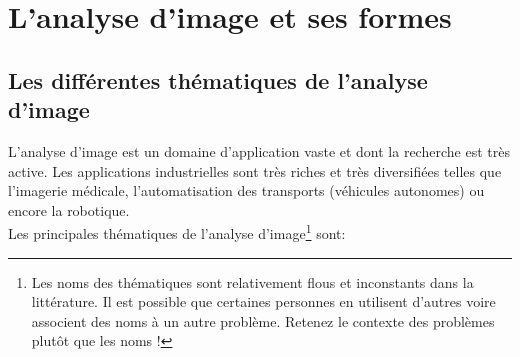 \section{L'analyse d'image et ses formes}
\label{conv_sec}
\subsection{Les différentes thématiques de l'analyse d'image}
L'analyse d'image est un domaine d'application vaste et dont la recherche est très active. Les applications industrielles sont très riches et très diversifiées telles que l'imagerie médicale, l'automatisation des transports (véhicules autonomes) ou encore la robotique. \\

\noindent Les principales thématiques de l'analyse d'image\footnote{Les noms des thématiques sont relativement flous et inconstants dans la littérature. Il est possible que certaines personnes en utilisent d'autres voire associent des noms à un autre problème. Retenez le contexte des problèmes plutôt que les noms !} sont:
